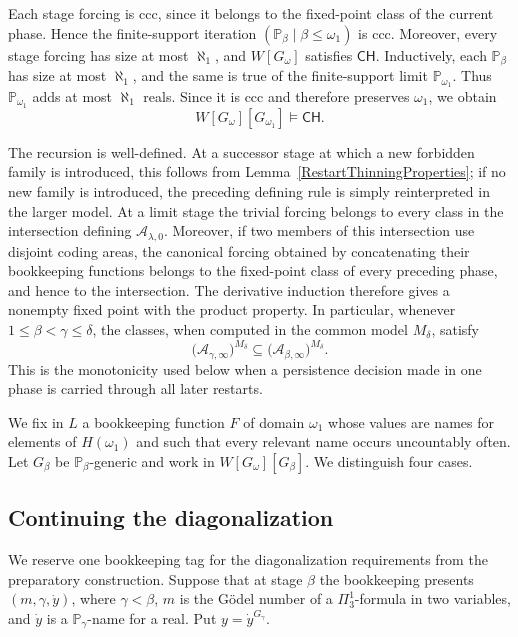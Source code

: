 \documentclass[a4paper,11pt]{article}
\newcommand{\forceP}{\mathbb{P}}
\newcommand{\CH}{\mathsf{CH}}
\begin{document}
Each stage forcing is ccc, since it belongs to the fixed-point class of the current phase. Hence the finite-support iteration $(\forceP_\beta\mid\beta\leq\omega_1)$ is ccc. Moreover, every stage forcing has size at most $\aleph_1$, and $W[G_\omega]$ satisfies $\CH$. Inductively, each $\forceP_\beta$ has size at most $\aleph_1$, and the same is true of the finite-support limit $\forceP_{\omega_1}$. Thus $\forceP_{\omega_1}$ adds at most $\aleph_1$ reals. Since it is ccc and therefore preserves $\omega_1$, we obtain
\[
W[G_\omega][G_{\omega_1}]\models\CH.
\]


The recursion is well-defined. At a successor stage at which a new forbidden family is introduced, this follows from Lemma~\ref{RestartThinningProperties}; if no new family is introduced, the preceding defining rule is simply reinterpreted in the larger model. At a limit stage the trivial forcing belongs to every class in the intersection defining $\mathcal A_{\lambda,0}$. Moreover, if two members of this intersection use disjoint coding areas, the canonical forcing obtained by concatenating their bookkeeping functions belongs to the fixed-point class of every preceding phase, and hence to the intersection. The derivative induction therefore gives a nonempty fixed point with the product property. In particular, whenever $1\leq\beta<\gamma\leq\delta$, the classes, when computed in the common model $M_\delta$, satisfy
\[
\bigl(\mathcal A_{\gamma,\infty}\bigr)^{M_\delta}
\subseteq
\bigl(\mathcal A_{\beta,\infty}\bigr)^{M_\delta}.
\]
This is the monotonicity used below when a persistence decision made in one phase is carried through all later restarts.

We fix in $L$ a bookkeeping function $F$ of domain $\omega_1$ whose values are names for elements of $H(\omega_1)$ and such that every relevant name occurs uncountably often. Let $G_\beta$ be $\forceP_\beta$-generic and work in $W[G_\omega][G_\beta]$. We distinguish four cases.

\subsection{Continuing the diagonalization}
We reserve one bookkeeping tag for the diagonalization requirements from the preparatory construction. Suppose that at stage $\beta$ the bookkeeping presents $(m,\gamma,\dot y)$, where $\gamma<\beta$, $m$ is the G\"odel number of a $\Pi^1_3$-formula in two variables, and $\dot y$ is a $\forceP_\gamma$-name for a real. Put $y=\dot y^{G_\gamma}$.
\end{document}
